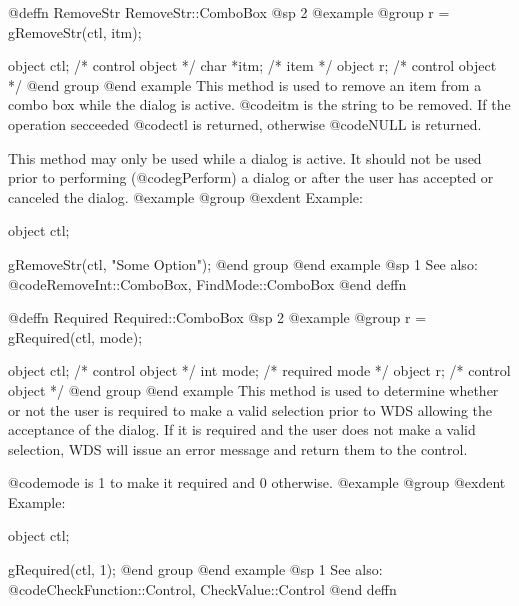 @deffn {RemoveStr} RemoveStr::ComboBox
@sp 2
@example
@group
r = gRemoveStr(ctl, itm);

object  ctl;    /*  control object  */
char   *itm;    /*  item            */
object  r;      /*  control object  */
@end group
@end example
This method is used to remove an item from a combo box while the dialog
is active.  @code{itm} is the string to be removed.
If the operation secceeded @code{ctl} is returned, otherwise @code{NULL}
is returned.

This method may only be used while a dialog is active.  It should not be
used prior to performing (@code{gPerform}) a dialog or after the user
has accepted or canceled the dialog.
@example
@group
@exdent Example:

object  ctl;

gRemoveStr(ctl, "Some Option");
@end group
@end example
@sp 1
See also:  @code{RemoveInt::ComboBox, FindMode::ComboBox}
@end deffn

















@deffn {Required} Required::ComboBox
@sp 2
@example
@group
r = gRequired(ctl, mode);

object  ctl;    /*  control object  */
int     mode;   /*  required mode   */
object  r;      /*  control object  */
@end group
@end example
This method is used to determine whether or not the user is required to
make a valid selection prior to WDS allowing the acceptance of the dialog.
If it is required and the user does not make a valid selection, WDS
will issue an error message and return them to the control.

@code{mode} is 1 to make it required and 0 otherwise.
@example
@group
@exdent Example:

object  ctl;

gRequired(ctl, 1);
@end group
@end example
@sp 1
See also:  @code{CheckFunction::Control, CheckValue::Control}
@end deffn



















